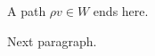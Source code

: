 \documentclass{article}
\newcommand{\path}{\rho}
\begin{document}
A path $\path v\in W$ ends here.

Next paragraph.
\end{document}
